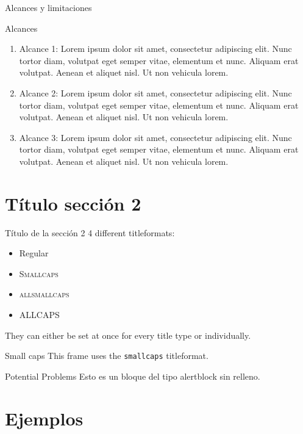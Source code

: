 \documentclass[10pt]{beamer}
\begin{document}
\begin{frame}[fragile]{Alcances y limitaciones}
      \begin{alertblock}{Alcances}
        \begin{enumerate}
          \item Alcance 1: Lorem ipsum dolor sit amet, consectetur adipiscing elit. Nunc tortor diam, volutpat eget semper vitae, elementum et nunc. Aliquam erat volutpat. Aenean et aliquet nisl. Ut non vehicula lorem.
          \item Alcance 2: Lorem ipsum dolor sit amet, consectetur adipiscing elit. Nunc tortor diam, volutpat eget semper vitae, elementum et nunc. Aliquam erat volutpat. Aenean et aliquet nisl. Ut non vehicula lorem.
          \item Alcance 3: Lorem ipsum dolor sit amet, consectetur adipiscing elit. Nunc tortor diam, volutpat eget semper vitae, elementum et nunc. Aliquam erat volutpat. Aenean et aliquet nisl. Ut non vehicula lorem.
        \end{enumerate}
      \end{alertblock}
\end{frame}

\section{Título sección 2}

\begin{frame}{Título de la sección 2}
	4 different titleformats:
	\begin{itemize}
		\item Regular
		\item \textsc{Smallcaps}
		\item \textsc{allsmallcaps}
		\item ALLCAPS
	\end{itemize}
	They can either be set at once for every title type or individually.
\end{frame}

\begin{frame}{Small caps}
	This frame uses the \texttt{smallcaps} titleformat.

	\begin{alertblock}{Potential Problems}
	Esto es un bloque del tipo alertblock sin relleno.
	\end{alertblock}
\end{frame}


\section{Ejemplos}
\end{document}
